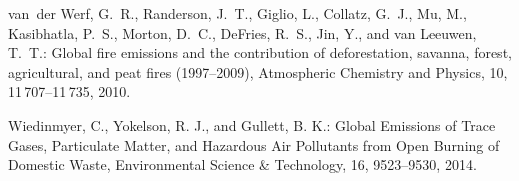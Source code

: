 \documentclass[12pt,a4paper]{article} %
\begin{document}
\begin{thebibliography}{}
van~der Werf, G.~R., Randerson, J.~T., Giglio, L., Collatz, G.~J., Mu, M.,
  Kasibhatla, P.~S., Morton, D.~C., DeFries, R.~S., Jin, Y., and van Leeuwen,
  T.~T.: Global fire emissions and the contribution of deforestation, savanna,
  forest, agricultural, and peat fires (1997--2009), Atmospheric Chemistry and
  Physics, 10, 11\,707--11\,735, 2010.

Wiedinmyer, C., Yokelson, R. J., and Gullett, B. K.: Global Emissions of Trace Gases, Particulate Matter, and Hazardous Air Pollutants from Open Burning of Domestic Waste, Environmental Science \& Technology, 16, 9523--9530, 2014.

\end{thebibliography}
\end{document}
